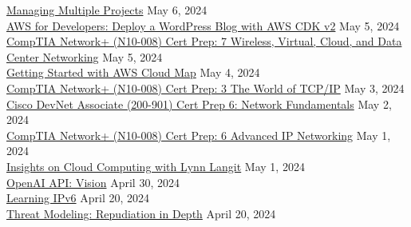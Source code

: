 \documentclass[10pt]{res} %
\begin{document}
\begin{resume}
\href{https://www.linkedin.com/learning/certificates/334b4b16774e7294a404fed19073ae55b2904dd418957625ffa0c9016fdb91b6}{\color{blue}Managing Multiple Projects} \hfill May 6, 2024 \\
\href{https://www.linkedin.com/learning/certificates/b831cc53d406ad500e2e2fac6bc084a6825bf3ce2090a721b6cff2e08665ecb8}{\color{blue}AWS for Developers: Deploy a WordPress Blog with AWS CDK v2} \hfill May 5, 2024 \\
\href{https://www.linkedin.com/learning/certificates/ae02b8c5dad0053af819f8619217b8785c5d0a4abedc0669a8d9b429992868de}{\color{blue}CompTIA Network+ (N10-008) Cert Prep: 7 Wireless, Virtual, Cloud, and Data Center Networking} \hfill May 5, 2024 \\
\href{https://www.linkedin.com/learning/certificates/72d4c30349eca9d453c1179b13e701d0449b8ba7712eda336359f47214aca6db}{\color{blue}Getting Started with AWS Cloud Map} \hfill May 4, 2024 \\
\href{https://www.linkedin.com/learning/certificates/618f1c1b479e4173d772f4e01ca8c87c39d29816b245a72ddb1550ec05b654d3}{\color{blue}CompTIA Network+ (N10-008) Cert Prep: 3 The World of TCP/IP} \hfill May 3, 2024 \\
\href{https://www.linkedin.com/learning/certificates/3a7aa6015f261a34baf980dccae7a5e94d536a9d4ced33baf780c75a8945d085}{\color{blue}Cisco DevNet Associate (200-901) Cert Prep 6: Network Fundamentals} \hfill May 2, 2024 \\
\href{https://www.linkedin.com/learning/certificates/dcf05e5d4fe91ed879b744bb753e15ed58275e5f4b2827361538a26a14fb1509}{\color{blue}CompTIA Network+ (N10-008) Cert Prep: 6 Advanced IP Networking} \hfill May 1, 2024 \\
\href{https://www.linkedin.com/learning/certificates/fb0b129106954bcfbfa4f389514c1fd39315631aa8254109a452cc176e0fd027}{\color{blue}Insights on Cloud Computing with Lynn Langit} \hfill May 1, 2024 \\
\href{https://www.linkedin.com/learning/certificates/7ec1c6f7c63f736e75bdd65f1e16d16c9871f30ac408f802664c03f3f714cfd1}{\color{blue}OpenAI API: Vision} \hfill April 30, 2024 \\
\href{https://www.linkedin.com/learning/certificates/43884c597a408c194bc65b9ebd25141cbc1974ce33918d9043e18b07066bed03}{\color{blue}Learning IPv6} \hfill April 20, 2024 \\
\href{https://www.linkedin.com/learning/certificates/f750793651194be3249e7a9fd28dff710c6fa88852b2e89360c1814ad13608b6}{\color{blue}Threat Modeling: Repudiation in Depth} \hfill April 20, 2024 \\

\end{resume}
\end{document}
